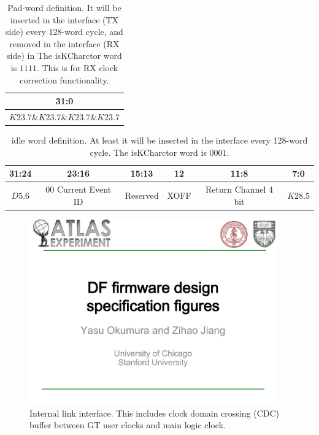 \documentclass[11pt,letterpaper]{article}
\begin{document}
\begin{table}[h]
\begin{tabular}{|c|}
\hline
31:0   \\ \hline
$K23.7\&K23.7\&K23.7\&K23.7$ \\ \hline
\end{tabular}
\caption{Pad-word definition. It will be inserted in the interface (TX side) every 128-word cycle, and removed in the interface (RX side) in The isKCharctor word is $1111$. This is for RX clock correction functionality.}
\end{table}

\begin{table}[h]
\begin{tabular}{|c|c|c|c|c|c|}
\hline
31:24 &23:16              & 15:13    & 12   & 11:8                 & 7:0   \\ \hline
$D5.6$ & $00$ Current Event ID & Reserved & XOFF & Return Channel 4 bit & $K28.5$ \\ \hline
\end{tabular}
\label{tab:internallinkidle}
\caption{idle word definition. At least it will be inserted in the interface every 128-word cycle. The isKCharctor word is $0001$.}
\end{table}

\begin{figure}[h!]
  \centering
  \includegraphics[width=0.95\textwidth,clip,page=13]{figures.pdf}
  \caption{Internal link interface. This includes clock domain crossing (CDC) buffer between GT user clocks and main logic clock.}
  \label{fig:EVENT_INTERNALINK}
\end{figure}
\end{document}
